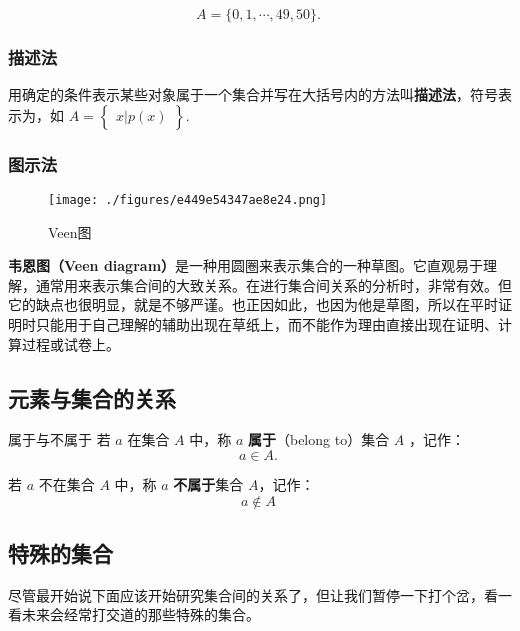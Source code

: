\begin{equation}
A=\{0,1, \cdots ,49,50\}.~
\end{equation}


\subsubsection{描述法}

用确定的条件表示某些对象属于一个集合并写在大括号内的方法叫\textbf{描述法}，符号表示为，如 $A=\begin{Bmatrix} x|p(x) \end{Bmatrix}$.

\subsubsection{图示法}

\begin{figure}[ht]
\centering
\texttt{[image: ./figures/e449e54347ae8e24.png]}
\caption{Veen图} \label{fig_SufCnd_1}
\end{figure}

\textbf{韦恩图（Veen diagram）}是一种用圆圈来表示集合的一种草图。它直观易于理解，通常用来表示集合间的大致关系。在进行集合间关系的分析时，非常有效。但它的缺点也很明显，就是不够严谨。也正因如此，也因为他是草图，所以在平时证明时只能用于自己理解的辅助出现在草纸上，而不能作为理由直接出现在证明、计算过程或试卷上。

\subsection{元素与集合的关系}

\begin{definition}{属于与不属于}
若 $a$ 在集合 $A$ 中，称 $a$ \textbf{属于}（belong to）集合 $A$ ，记作：
\begin{equation}
a \in A.~
\end{equation}

若 $a$ 不在集合 $A$ 中，称 $a$ \textbf{不属于}集合 $A$，记作：
\begin{equation}
a\notin A~
\end{equation}
\end{definition}

\subsection{特殊的集合}

尽管最开始说下面应该开始研究集合间的关系了，但让我们暂停一下打个岔，看一看未来会经常打交道的那些特殊的集合。

